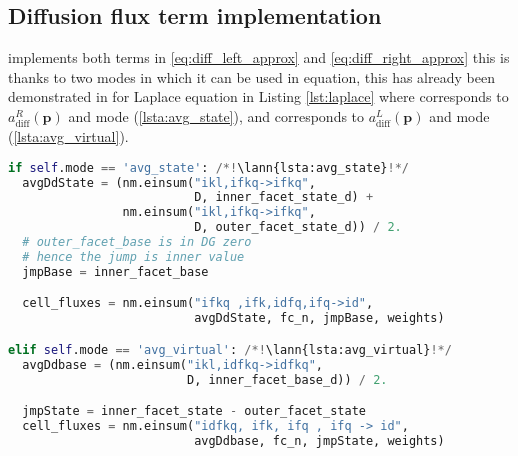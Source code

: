 \subsection{Diffusion flux term implementation}
\label{se:diff_flux_term_imp}
 implements both terms in 
\eqref{eq:diff_left_approx} and \eqref{eq:diff_right_approx} this is thanks to two modes in which it 
can be used in equation, this has already been demonstrated in for Laplace equation in Listing 
\ref{lst:laplace} where  corresponds to 
$a^R_\mathrm{diff}(\mathbf{p})$ and mode  (\ref{lsta:avg_state}), and 
 corresponds to $a^L_\mathrm{diff}(\mathbf{p})$ 
and mode  (\ref{lsta:avg_virtual}).
\setcounter{lstannotation}{0}
\begin{lstlisting}[language=Python, caption=Computation of diffusion cell 
fluxes]
if self.mode == 'avg_state': /*!\lann{lsta:avg_state}!*/
  avgDdState = (nm.einsum("ikl,ifkq->ifkq", 
                          D, inner_facet_state_d) +
                nm.einsum("ikl,ifkq->ifkq", 
                          D, outer_facet_state_d)) / 2.
  # outer_facet_base is in DG zero 
  # hence the jump is inner value
  jmpBase = inner_facet_base

  cell_fluxes = nm.einsum("ifkq ,ifk,idfq,ifq->id", 
                          avgDdState, fc_n, jmpBase, weights)

elif self.mode == 'avg_virtual': /*!\lann{lsta:avg_virtual}!*/
  avgDdbase = (nm.einsum("ikl,idfkq->idfkq",
                         D, inner_facet_base_d)) / 2.

  jmpState = inner_facet_state - outer_facet_state
  cell_fluxes = nm.einsum("idfkq, ifk, ifq , ifq -> id", 
                          avgDdbase, fc_n, jmpState, weights)
\end{lstlisting}


